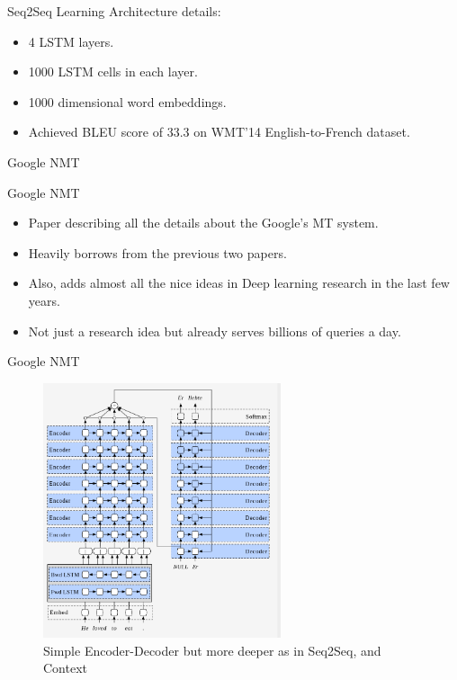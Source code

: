 ﻿\documentclass[table,aspectratio=43,mathserif,xcolor={usenames,dvipsnames,svgnames,table},10pt]{beamer}
\begin{document}
\begin{frame}{Seq2Seq Learning}
 Architecture details:
\begin{itemize}
 \item<+->  4 LSTM layers.
 \item<+->  1000 LSTM cells in each layer.
 \item<+->  1000 dimensional word embeddings.
 \item<+->  Achieved BLEU score of 33.3 on WMT’14 English-to-French dataset.
\end{itemize}
\end{frame}


\begin{section}{Google NMT}
\end{section}

\begin{frame}{Google NMT}
\begin{itemize}
 \item<+-> Paper describing all the details about the Google's MT system.
 \item<+-> Heavily borrows from the previous two papers.
 \item<+-> Also, adds almost all the nice ideas in Deep learning research in the last few years.
 \item<+-> Not just a research idea but already serves billions of queries a day.
\end{itemize}
\end{frame}


\begin{frame}{Google NMT}
 \begin{figure}[h]
    \includegraphics[height=7.5cm]{images/gnmt_1.png}  
    \caption{Simple Encoder-Decoder but more deeper as in Seq2Seq, and Context}
  \end{figure}
\end{frame}
\end{document}
